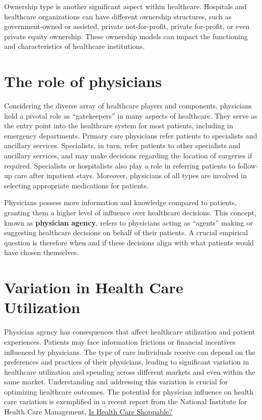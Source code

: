 \documentclass[
  letterpaper,
  DIV=11,
  numbers=noendperiod]{scrreport}
\theoremstyle{definition}
\theoremstyle{remark}
\begin{document}
Ownership type is another significant aspect within healthcare.
Hospitals and healthcare organizations can have different ownership
structures, such as government-owned or assisted, private
not-for-profit, private for-profit, or even private equity ownership.
These ownership models can impact the functioning and characteristics of
healthcare institutions.

\hypertarget{the-role-of-physicians}{%
\section{The role of physicians}\label{the-role-of-physicians}}

Considering the diverse array of healthcare players and components,
physicians hold a pivotal role as ``gatekeepers'' in many aspects of
healthcare. They serve as the entry point into the healthcare system for
most patients, including in emergency departments. Primary care
physicians refer patients to specialists and ancillary services.
Specialists, in turn, refer patients to other specialists and ancillary
services, and may make decisions regarding the location of surgeries if
required. Specialists or hospitalists also play a role in referring
patients to follow-up care after inpatient stays. Moreover, physicians
of all types are involved in selecting appropriate medications for
patients.

Physicians possess more information and knowledge compared to patients,
granting them a higher level of influence over healthcare decisions.
This concept, known as \textbf{physician agency}, refers to physicians
acting as ``agents'' making or suggesting healthcare decisions on behalf
of their patients. A crucial empirical question is therefore when and if
these decisions align with what patients would have chosen themselves.

\hypertarget{variation-in-health-care-utilization}{%
\section{Variation in Health Care
Utilization}\label{variation-in-health-care-utilization}}

Physician agency has consequences that affect healthcare utilization and
patient experiences. Patients may face information frictions or
financial incentives influenced by physicians. The type of care
individuals receive can depend on the preferences and practices of their
physicians, leading to significant variation in healthcare utilization
and spending across different markets and even within the same market.
Understanding and addressing this variation is crucial for optimizing
healthcare outcomes. The potential for physician influence on health
care variation is exemplified in a recent report from the National
Institute for Health Care Management,
\href{https://nihcm.org/publications/is-health-care-shoppable-1}{Is
Health Care Shoppable?}
\end{document}
